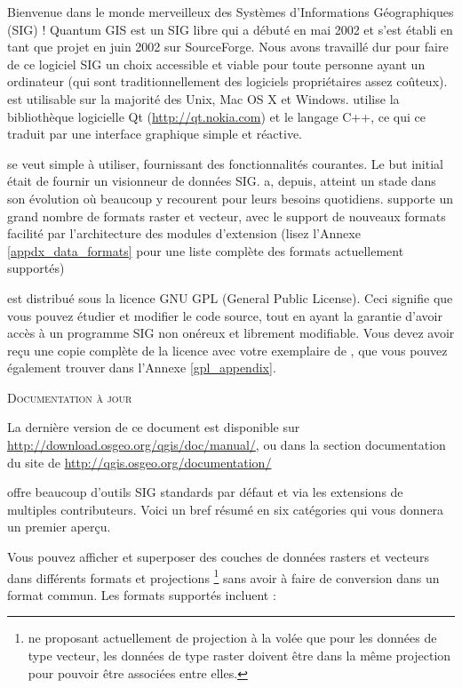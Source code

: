 \mainmatter
\pagestyle{scrheadings}
\label{label_forward}

Bienvenue dans le monde merveilleux des Systèmes d'Informations Géographiques (SIG) ! Quantum GIS est un SIG libre qui a débuté en mai 2002 et s'est établi en tant que projet en juin 2002 sur SourceForge. Nous avons travaillé dur pour faire de ce logiciel SIG un choix accessible et viable pour toute personne ayant un ordinateur  (qui sont traditionnellement des logiciels propriétaires assez coûteux). \qg est utilisable sur la majorité des Unix, Mac OS X et Windows. \qg utilise la bibliothèque logicielle Qt (\url{http://qt.nokia.com}) et le langage C++, ce qui ce traduit par une interface graphique simple et réactive.

\qg se veut simple à utiliser, fournissant des fonctionnalités courantes. Le but initial était de fournir un visionneur de données SIG. \qg a, depuis, atteint un stade dans son évolution où beaucoup y recourent pour leurs besoins quotidiens. \qg supporte un grand nombre de formats raster et vecteur, avec le support de nouveaux formats facilité par l'architecture des modules d'extension (lisez l'Annexe \ref{appdx_data_formats} pour une liste complète des formats actuellement supportés)

\qg est distribué sous la licence GNU GPL (General Public License). Ceci signifie que vous pouvez étudier et modifier le code source, tout en ayant la garantie d'avoir accès à un programme SIG non onéreux et librement modifiable. Vous devez avoir reçu une copie complète de la licence avec votre exemplaire de \qg, que vous pouvez également trouver dans l'Annexe \ref{gpl_appendix}.

\begin{Tip}\caption{\textsc{Documentation à jour}}
La dernière version de ce document est disponible sur \url{http://download.osgeo.org/qgis/doc/manual/}, ou dans la section documentation du site de \qg \url{http://qgis.osgeo.org/documentation/}
\end{Tip}

\label{label_majfeat}

\qg offre beaucoup d'outils SIG standards par défaut et via les extensions de multiples contributeurs. Voici un bref résumé en six catégories qui vous donnera un premier aperçu.


Vous pouvez afficher et superposer des couches de données rasters et vecteurs dans différents formats et projections \footnote{\qg ne proposant actuellement de projection à la volée que pour les données de type vecteur, les données de type raster doivent être dans la même projection pour pouvoir être associées entre elles.} sans avoir à faire de conversion dans un format commun. Les formats supportés incluent :

